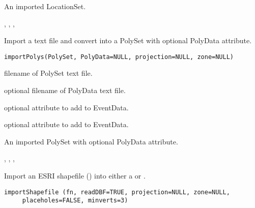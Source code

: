 \documentclass[letterpaper]{book}
\begin{document}
%
\begin{Value}
An imported LocationSet.
\end{Value}
%
\begin{SeeAlso}\relax
{}, , , 
\end{SeeAlso}
%
\begin{Description}\relax
Import a text file and convert into a PolySet with optional PolyData attribute.
\end{Description}
%
\begin{Usage}
\begin{verbatim}
importPolys(PolySet, PolyData=NULL, projection=NULL, zone=NULL)
\end{verbatim}
\end{Usage}
%
\begin{Arguments}
\begin{ldescription}
\item[\code{PolySet}] filename of PolySet text file.
\item[\code{PolyData}] optional filename of PolyData text file.
\item[\code{projection}] optional  attribute to add to
EventData.
\item[\code{zone}] optional  attribute to add to EventData.
\end{ldescription}
\end{Arguments}
%
\begin{Value}
An imported PolySet with optional PolyData attribute.
\end{Value}
%
\begin{SeeAlso}\relax
{}, , , 
\end{SeeAlso}
%
\begin{Description}\relax
Import an ESRI shapefile () into either a 
 or .
\end{Description}
%
\begin{Usage}
\begin{verbatim}
importShapefile (fn, readDBF=TRUE, projection=NULL, zone=NULL, 
     placeholes=FALSE, minverts=3)
\end{verbatim}
\end{Usage}
\end{document}
